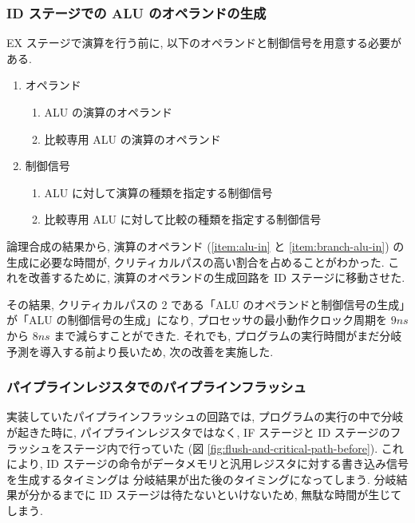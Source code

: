 \documentclass[../improvements.tex]{subfiles}
\begin{document}
  \subsubsection{ID ステージでの ALU のオペランドの生成} \label{subsubsection:ex-to-id}
  EX ステージで演算を行う前に, 以下のオペランドと制御信号を用意する必要がある.
  \begin{enumerate}
    \item オペランド
      \begin{enumerate}
        \item ALU の演算のオペランド \label{item:alu-in}
        \item 比較専用 ALU の演算のオペランド \label{item:branch-alu-in}
      \end{enumerate}
    \item 制御信号
      \begin{enumerate}
        \item ALU に対して演算の種類を指定する制御信号 \label{item:alu-op}
        \item 比較専用 ALU に対して比較の種類を指定する制御信号 \label{item:branch-alu-op}
      \end{enumerate}
  \end{enumerate}
  論理合成の結果から, 演算のオペランド (\ref{item:alu-in} と \ref{item:branch-alu-in}) の生成に必要な時間が, 
  クリティカルパスの高い割合を占めることがわかった.
  これを改善するために, 演算のオペランドの生成回路を ID ステージに移動させた.

  その結果, クリティカルパスの 2 である「ALU のオペランドと制御信号の生成」が「ALU の制御信号の生成」になり, 
  プロセッサの最小動作クロック周期を $9\unit{ns}$ から $8\unit{ns}$ まで減らすことができた.
  それでも, プログラムの実行時間がまだ分岐予測を導入する前より長いため, 次の改善を実施した.

  \subsubsection{パイプラインレジスタでのパイプラインフラッシュ} \label{subsubsection:rethink-flush}
  実装していたパイプラインフラッシュの回路では, 
  プログラムの実行の中で分岐が起きた時に, 
  パイプラインレジスタではなく, IF ステージと ID ステージのフラッシュをステージ内で行っていた (図 \ref{fig:flush-and-critical-path-before}).
  これにより, ID ステージの命令がデータメモリと汎用レジスタに対する書き込み信号を生成するタイミングは
  分岐結果が出た後のタイミングになってしまう.
  分岐結果が分かるまでに ID ステージは待たないといけないため, 無駄な時間が生じてしまう.
\end{document}
